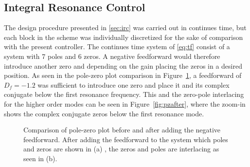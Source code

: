 \subsection{Integral Resonance Control}
The \abbrIRC design procedure presented in \ref{sec:irc} was carried out in continues time, but each block in the scheme was individually discretized for the sake of comparison with the present controller. The continues time system of \eqref{eq:tf} consist of a system with 7 poles and 6 zeros. A negative feedforward would therefore introduce another zero and depending on the gain placing the zeros in a desired position. As seen in the pole-zero plot comparison in Figure~\ref{fig:negfeedpzmap}, a feedforward of $D_f=-1.2$ was sufficient to introduce one zero and place it and its complex conjugate below the first resonance frequency. This and the zero-pole interlacing for the higher order modes can be seen in Figure~\ref{fig:pzafter}, where the zoom-in shows the complex conjugate zeros below the first resonance mode.

\begin{figure}[h!]
  \centering %
  \qquad
  \caption{\label{fig:negfeedpzmap} Comparison of pole-zero plot before and after adding the negative feedforward. After adding the feedforward to the system which poles and zeros are shown in (a) , the zeros and poles are interlacing as seen in (b).}
\end{figure}


